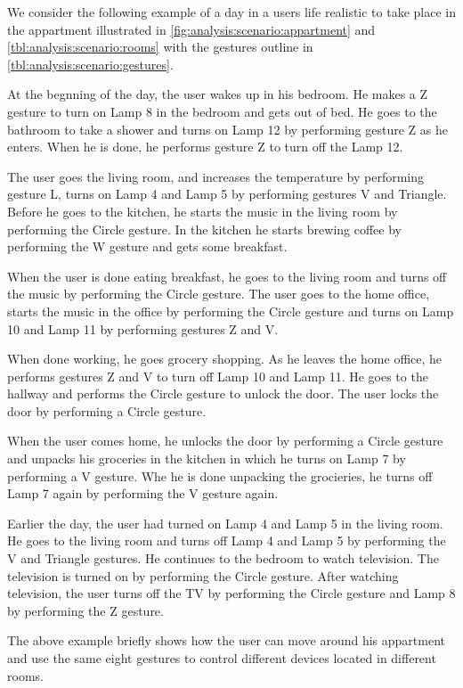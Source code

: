 We consider the following example of a day in a users life realistic to take place in the appartment illustrated in \cref{fig:analysis:scenario:appartment} and \cref{tbl:analysis:scenario:rooms} with the gestures outline in \cref{tbl:analysis:scenario:gestures}.

\begin{testexample}
At the begnning of the day, the user wakes up in his bedroom. He makes a Z gesture to turn on Lamp 8 in the bedroom and gets out of bed. He goes to the bathroom to take a shower and turns on Lamp 12 by performing gesture Z as he enters. When he is done, he performs gesture Z to turn off the Lamp 12.

The user goes the living room, and increases the temperature by performing gesture L, turns on Lamp 4 and Lamp 5 by performing gestures V and Triangle. Before he goes to the kitchen, he starts the music in the living room by performing the Circle gesture. In the kitchen he starts brewing coffee by performing the W gesture and gets some breakfast.

When the user is done eating breakfast, he goes to the living room and turns off the music by performing the Circle gesture. The user goes to the home office, starts the music in the office by performing the Circle gesture and turns on Lamp 10 and Lamp 11 by performing gestures Z and V.

When done working, he goes grocery shopping. As he leaves the home office, he performs gestures Z and V to turn off Lamp 10 and Lamp 11. He goes to the hallway and performs the Circle gesture to unlock the door. The user locks the door by performing a Circle gesture.

When the user comes home, he unlocks the door by performing a Circle gesture and unpacks his groceries in the kitchen in which he turns on Lamp 7 by performing a V gesture. Whe he is done unpacking the grocieries, he turns off Lamp 7 again by performing the V gesture again.

Earlier the day, the user had turned on Lamp 4 and Lamp 5 in the living room. He goes to the living room and turns off Lamp 4 and Lamp 5 by performing the V and Triangle gestures. He continues to the bedroom to watch television. The television is turned on by performing the Circle gesture. After watching television, the user turns off the TV by performing the Circle gesture and Lamp 8 by performing the Z gesture.
\end{testexample}

The above example briefly shows how the user can move around his appartment and use the same eight gestures to control different devices located in different rooms.


